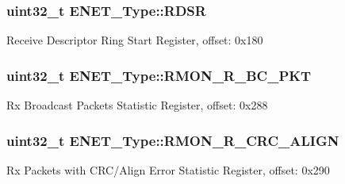 \subsubsection[{\texorpdfstring{R\+D\+SR}{RDSR}}]{ uint32\+\_\+t E\+N\+E\+T\+\_\+\+Type\+::\+R\+D\+SR}\hypertarget{structENET__Type_ab84eeffd56da6b3e88467b83e883715f}{}\label{structENET__Type_ab84eeffd56da6b3e88467b83e883715f}
Receive Descriptor Ring Start Register, offset\+: 0x180 
\subsubsection[{\texorpdfstring{R\+M\+O\+N\+\_\+\+R\+\_\+\+B\+C\+\_\+\+P\+KT}{RMON_R_BC_PKT}}]{ uint32\+\_\+t E\+N\+E\+T\+\_\+\+Type\+::\+R\+M\+O\+N\+\_\+\+R\+\_\+\+B\+C\+\_\+\+P\+KT}\hypertarget{structENET__Type_aaea72d7da486ff03939eee6062ba9497}{}\label{structENET__Type_aaea72d7da486ff03939eee6062ba9497}
Rx Broadcast Packets Statistic Register, offset\+: 0x288 
\subsubsection[{\texorpdfstring{R\+M\+O\+N\+\_\+\+R\+\_\+\+C\+R\+C\+\_\+\+A\+L\+I\+GN}{RMON_R_CRC_ALIGN}}]{ uint32\+\_\+t E\+N\+E\+T\+\_\+\+Type\+::\+R\+M\+O\+N\+\_\+\+R\+\_\+\+C\+R\+C\+\_\+\+A\+L\+I\+GN}\hypertarget{structENET__Type_a6a20623322c8412263dfdad72ff1b3b0}{}\label{structENET__Type_a6a20623322c8412263dfdad72ff1b3b0}
Rx Packets with C\+R\+C/\+Align Error Statistic Register, offset\+: 0x290 
